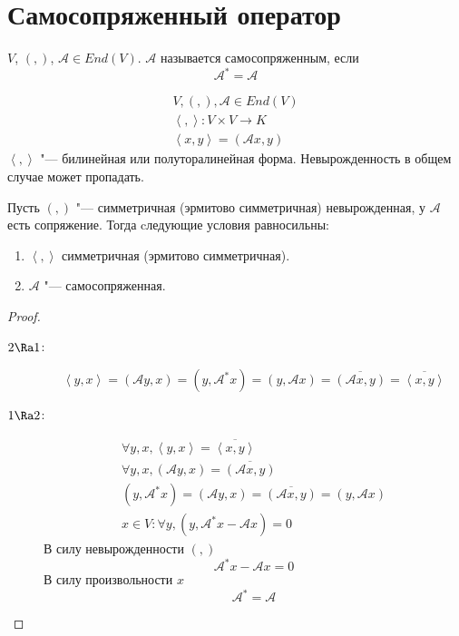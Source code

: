 \section{Самосопряженный оператор}

\begin{Def}
	$V$, $(,)$, $\mathcal A \in End(V)$.
	$\mathcal A $ называется самосопряженным, если
	\[ \mathcal A^* = \mathcal A \]
\end{Def}
\begin{gather*}
	V, (,), \mathcal A \in End(V) \\
	\left<, \right>\colon V \times V \to K \\
	\left<x, y\right> = (\mathcal A x, y)
\end{gather*}
$\left<,\right>$ "--- билинейная или полуторалинейная форма.
Невырожденность в общем случае может пропадать.

\begin{theorem}
	Пусть $(,)$ "--- симметричная (эрмитово симметричная) невырожденная, у $\mathcal A $ есть сопряжение.
	Тогда cледующие условия равносильны:
	\begin{enumerate}
		\item $\left<,\right>$  симметричная (эрмитово симметричная).
		\item $\mathcal A$  "--- самосопряженная.
	\end{enumerate}
\end{theorem}
\begin{proof}
	\begin{description}
	\item[$2 \Ra 1$:]
		\[
			\left<y, x\right> = (\mathcal A y, x) = (y, \mathcal A^*x)
			= (y, \mathcal A x) = \overline{(\mathcal A x, y)} = \overline{\left<x, y\right>}
		\]

	\item[$1 \Ra 2$:]
		\begin{gather*}
			\forall y, x, \left<y, x\right> = \overline{\left<x, y\right>} \\
			\forall y, x, (\mathcal A y, x) = \overline{(\mathcal A x, y)} \\
			(y, \mathcal A^*x) = (\mathcal A y, x) = \overline{(\mathcal A x, y)} = (y, \mathcal A x) \\
			x \in V \colon \forall y, (y, \mathcal A^*x - \mathcal A x) = 0
		\end{gather*}
		В силу невырожденности $(,)$
		\[ \mathcal A^*x - \mathcal A x = 0 \]
		В силу произвольности $x$
		\[ \mathcal A^* = \mathcal A \]
	\end{description}
\end{proof}

